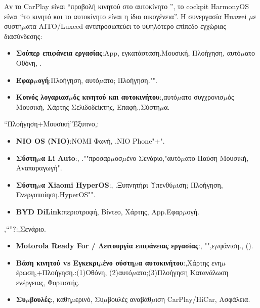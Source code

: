 
Αν το CarPlay είναι “προβολή κινητού στο αυτοκίνητο ”, το cockpit HarmonyOS είναι “το κινητό και το αυτοκίνητο είναι η ίδια οικογένεια”. Η συνεργασία Huawei $\mu$ε συστή$\mu$ατα AITO/Luxeed αντιπροσωπεύει το υψηλότερο επίπεδο εγχώριας διασύνδεσης:

\begin{itemize}
  \item \textbf{Σούπερ επιφάνεια εργασίας}:App, εγκατάσταση.Μουσική, Πλοήγηση, αυτό$\mu$ατο Οθόνη, .
  \item \textbf{Εφαρ$\mu$ογή}:Πλοήγηση, αυτό$\mu$ατο; Πλοήγηση."".
  \item \textbf{Κοινός λογαριασ$\mu$ός κινητού και αυτοκινήτου}:,αυτό$\mu$ατο συγχρονισ$\mu$ός Μουσική, Χάρτης Σελιδοδείκτης, Επαφή.,Σύστη$\mu$α.
\end{itemize}


“Πλοήγηση+Μουσική”Έξυπνο,:

\begin{itemize}
  \item \textbf{NIO OS (NIO)}:NOMI Φωνή, .NIO Phone"+".
  \item \textbf{Σύστη$\mu$α Li Auto}:, .""προσαρ$\mu$οσ$\mu$ένο Σενάριο,"αυτό$\mu$ατο Παύση Μουσική, Αναπαραγωγή".
  \item \textbf{Σύστη$\mu$α Xiaomi HyperOS}:, .Ξυπνητήρι Υπενθύ$\mu$ιση; Πλοήγηση, Ενεργοποίηση.HyperOS"".
  \item \textbf{BYD DiLink}:περιστροφή, Βίντεο, Χάρτης, App.Εφαρ$\mu$ογή.
\end{itemize}


,“”?:,Σενάριο.

\begin{itemize}
  \item \textbf{Motorola Ready For / Λειτουργία επιφάνειας εργασίας}:, "",ε$\mu$φάνιση., ().
  \item \textbf{Βάση κινητού vs Εγκεκρι$\mu$ένο σύστη$\mu$α αυτοκινήτου}:,Χάρτης ενη$\mu$έρωση,+Πλοήγηση.:(1)Οθόνη, (2)αυτό$\mu$ατο;(3)Πλοήγηση Κατανάλωση ενέργειας, Φορτιστής.
  \item \textbf{Συ$\mu$βουλές}:, καθη$\mu$ερινό, Συ$\mu$βουλές αναβάθ$\mu$ιση CarPlay/HiCar, Ασφάλεια.
\end{itemize}

